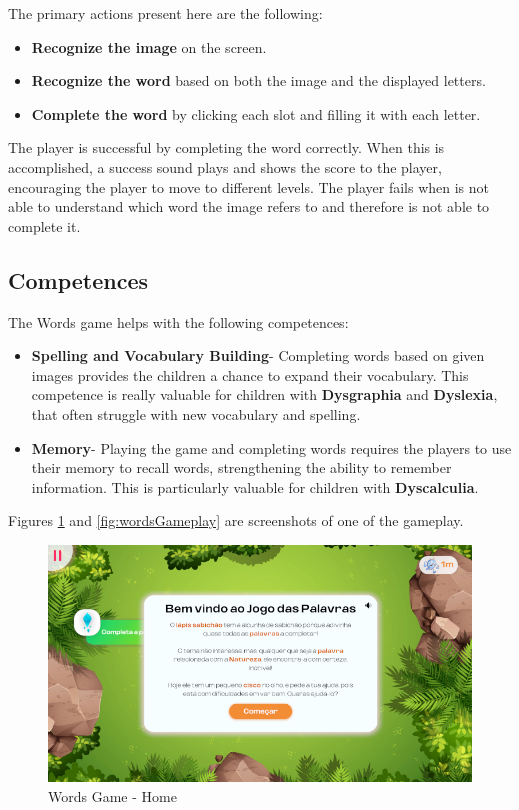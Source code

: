 The primary actions present here are the following:

\begin{itemize}
    \item \textbf{Recognize the image} on the screen.
    \item \textbf{Recognize the word} based on both the image and the displayed letters.
    \item \textbf{Complete the word} by clicking each slot and filling it with each letter.
\end{itemize}

The player is successful by completing the word correctly. When this is accomplished, a success sound plays and shows the score to the player, encouraging the player to move to different levels.
The player fails when is not able to understand which word the image refers to and therefore is not able to complete it.

\subsection*{Competences}
The Words game helps with the following competences:

\begin{itemize}
    \item \textbf{Spelling and Vocabulary Building}- Completing words based on given images provides the children a chance to expand their vocabulary. This competence is really valuable for children with \textbf{Dysgraphia} and \textbf{Dyslexia}, that often struggle with new vocabulary and spelling.

    \item \textbf{Memory}- Playing the game and completing words requires the players to use their memory to recall words, strengthening the ability to remember information. This is particularly valuable for children with \textbf{Dyscalculia}.
\end{itemize}

Figures \ref{fig:wordsHome} and \ref{fig:wordsGameplay} are screenshots of one of the gameplay.

\begin{figure}[H]
    \centering
    \includegraphics[width=0.9\linewidth]{Chapters/gameplay/new_screens/words_home.png}
    \caption{Words Game - Home}
    \label{fig:wordsHome}    
\end{figure}

